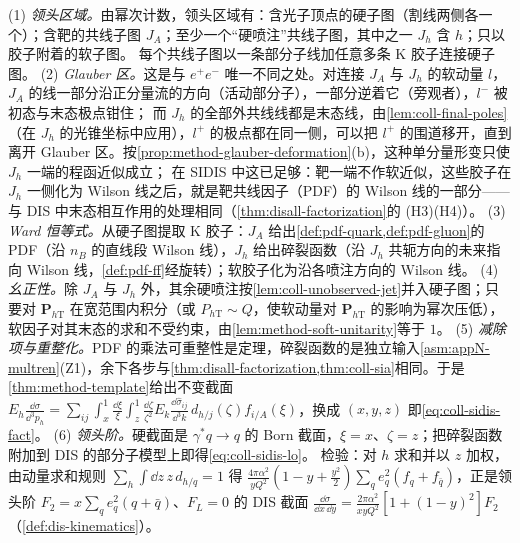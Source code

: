 \begin{proofsketch}
(1) \emph{领头区域。}由幂次计数，领头区域有：含光子顶点的硬子图（割线两侧各一个）；含靶的共线子图 $J_A$；至少一个“硬喷注”共线子图，其中之一 $J_h$ 含 $h$；只以胶子附着的软子图\cite[第~12.14.2~节]{Collins2011}。
每个共线子图以一条部分子线加任意多条 K 胶子连接硬子图。
(2) \emph{Glauber 区。}这是与 $e^+e^-$ 唯一不同之处。对连接 $J_A$ 与 $J_h$ 的软动量 $l$，$J_A$ 的线一部分沿正分量流的方向（活动部分子），一部分逆着它（旁观者），$l^-$ 被初态与末态极点钳住\cite[式~(12.94)]{Collins2011}；
而 $J_h$ 的全部外共线线都是末态线，由\cref{lem:coll-final-poles}（在 $J_h$ 的光锥坐标中应用），$l^+$ 的极点都在同一侧，可以把 $l^+$ 的围道移开，直到离开 Glauber 区。按\cref{prop:method-glauber-deformation}(b)，这种单分量形变只使 $J_h$ 一端的程函近似成立；
在 SIDIS 中这已足够：靶一端不作软近似，这些胶子在 $J_h$ 一侧化为 Wilson 线之后，就是靶共线因子（PDF）的 Wilson 线的一部分——与 DIS 中末态相互作用的处理相同（\cref{thm:disall-factorization}的 (H3)(H4)）。
(3) \emph{Ward 恒等式。}从硬子图提取 K 胶子：$J_A$ 给出\cref{def:pdf-quark,def:pdf-gluon}的 PDF（沿 $n_B$ 的直线段 Wilson 线），$J_h$ 给出碎裂函数（沿 $J_h$ 共轭方向的未来指向 Wilson 线，\cref{def:pdf-ff}经旋转）；软胶子化为沿各喷注方向的 Wilson 线。
(4) \emph{幺正性。}除 $J_A$ 与 $J_h$ 外，其余硬喷注按\cref{lem:coll-unobserved-jet}并入硬子图；只要对 $\bm P_{h\mathrm T}$ 在宽范围内积分（或 $P_{h\mathrm T}\sim Q$，使软动量对 $\bm P_{h\mathrm T}$ 的影响为幂次压低），软因子对其末态的求和不受约束，由\cref{lem:method-soft-unitarity}等于 $1$\cite[第~12.14.4~节]{Collins2011}。
(5) \emph{减除项与重整化。}PDF 的乘法可重整性是定理，碎裂函数的是独立输入\cref{asm:appN-multren}(Z1)，余下各步与\cref{thm:disall-factorization,thm:coll-sia}相同。于是\cref{thm:method-template}给出不变截面
$E_h\frac{\dd\sigma}{\dd^3p_h}=\sum_{ij}\int_x^1\frac{\dd\xi}\xi\int_z^1\frac{\dd\zeta}{\zeta^2}E_k\frac{\dd\hat\sigma_{ij}}{\dd^3k}\,d_{h/j}(\zeta)f_{i/A}(\xi)$\cite[式~(12.95)]{Collins2011}，换成 $(x,y,z)$ 即\cref{eq:coll-sidis-fact}。
(6) \emph{领头阶。}硬截面是 $\gamma^*q\to q$ 的 Born 截面，$\xi=x$、$\zeta=z$；把碎裂函数附加到 DIS 的部分子模型上即得\cref{eq:coll-sidis-lo}\cite[式~(12.91)]{Collins2011}。
检验：对 $h$ 求和并以 $z$ 加权，由动量求和规则 $\sum_h\int\dd z\,z\,d_{h/q}=1$ 得 $\frac{4\pi\alpha^2}{yQ^2}(1-y+\frac{y^2}2)\sum_qe_q^2(f_q+f_{\bar q})$，正是领头阶 $F_2=x\sum_qe_q^2(q+\bar q)$、$F_L=0$ 的 DIS 截面
$\frac{\dd\sigma}{\dd x\,\dd y}=\frac{2\pi\alpha^2}{xyQ^2}[1+(1-y)^2]F_2$（\cref{def:dis-kinematics}）。%
\end{proofsketch}

